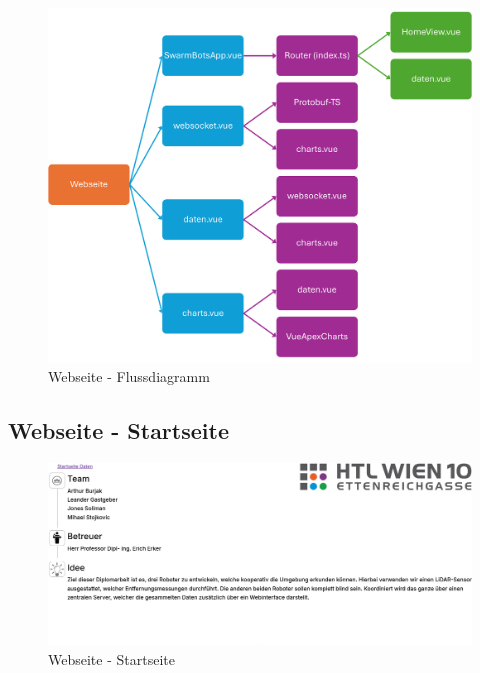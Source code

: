 \begin{figure}[H]
  \includegraphics[width=\textwidth, center]{img/Webseite_FD.png}
  \caption{Webseite - Flussdiagramm}
  \label{fig:Webseite_Flowchart}
\end{figure}

\subsection{Webseite - Startseite}
\label{subsubsec:Webseite_Startseite}

\begin{figure}[H]
  \includegraphics[width=\textwidth, center]{img/Webseite_Startseite.png}
  \caption{Webseite - Startseite}
  \label{fig:Webseite_Startseite}
\end{figure}

